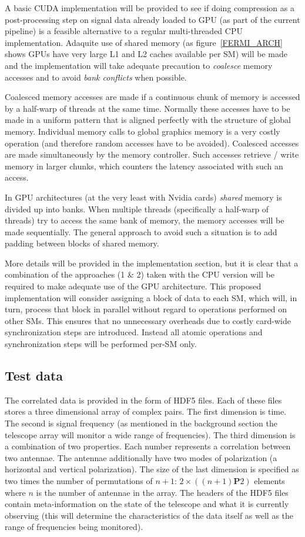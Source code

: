 A basic CUDA implementation will be provided to see if doing compression as a post-processing step on signal data already loaded to GPU (as part of the current pipeline) is a 
feasible alternative to a regular multi-threaded CPU implementation. Adaquite use of shared memory (as figure~\ref{FERMI_ARCH} shows GPUs have very large L1 and L2 caches available per SM) 
will be made and the implementation will take adequate precaution to \textit{coalesce} memory accesses and to avoid \textit{bank conflicts} when possible. 

Coalesced memory accesses are made if a continuous chunk of memory is accessed by a half-warp of threads at the same time. Normally these accesses have to be made in a uniform pattern that is aligned perfectly
with the structure of global memory. Individual memory calls to global graphics memory is a very costly operation (and therefore random accesses have to be avoided). Coalesced accesses are made simultaneously by 
the memory controller. Such accesses retrieve / write memory in larger chunks, which counters the latency associated with such an access. 

In GPU architectures (at the very least with Nvidia cards) \emph{shared} memory is divided up into banks. When multiple threads (specifically a half-warp of threads) try to 
access the same bank of memory, the memory accesses will be made sequentially. The general approach to avoid such a situation is to add padding between blocks of shared memory.

More details will be provided in the implementation section, but it is clear that a combination of the approaches (1 \& 2) taken with the CPU version will be required to make 
adequate use of the GPU architecture. This proposed implementation will consider assigning a block of data to each SM, which will, in turn, process that block in parallel without 
regard to operations performed on other SMs. This ensures that no unnecessary overheads due to costly card-wide synchronization steps are introduced. Instead all atomic 
operations and synchronization steps will be performed per-SM only.
\subsection{Test data}
The correlated data is provided in the form of HDF5 files. Each of these files stores a three dimensional array of complex pairs. The first dimension is time. The second 
is signal frequency (as mentioned in the background section the telescope array will monitor a wide range of frequencies). The third dimension is a combination of two 
properties. Each number represents a correlation between two antennae. The antennae additionally have two modes of polarization (a horizontal and vertical polarization). 
The size of the last dimension is specified as two times the number of permutations of $n + 1$: $2\times((n+1)\mathbf{P}2)$ elements where $n$ is the number of
antennae in the array. The headers of the HDF5 files contain meta-information on the state of the telescope and what it is currently observing (this will determine the 
characteristics of the data itself as well as the range of frequencies being monitored). 

